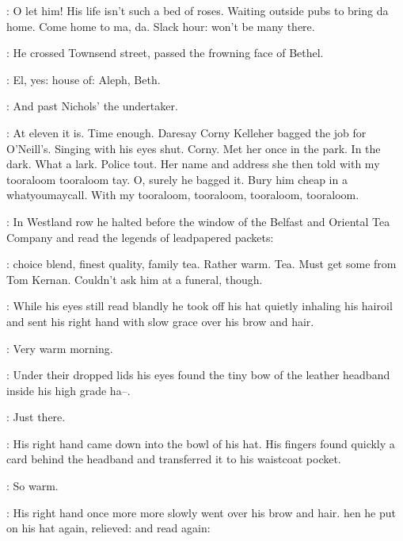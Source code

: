 \BloomInt:
O let him!
His life isn't such a bed of roses.
Waiting outside pubs to bring da home.
Come home to ma, da.
Slack hour: won't be many there.

:
He crossed Townsend street,
passed the frowning face of Bethel.

\BloomInt:
El, yes:
house of: Aleph, Beth.

:
And past Nichols' the undertaker.

\BloomInt:
At eleven it is.
Time enough.
Daresay Corny Kelleher bagged the job for O'Neill's.
Singing with his eyes shut.
Corny.
Met her once in the park.
In the dark.
What a lark.
Police tout.
Her name and address she then told
with my tooraloom tooraloom tay.
O, surely he bagged it.
Bury him cheap in a whatyoumaycall.
With my tooraloom, tooraloom, tooraloom, tooraloom.


:
In Westland row
he halted before the window of the Belfast and Oriental Tea Company
and read the legends of leadpapered packets:

\BloomInt:
choice blend, finest quality, family tea.
Rather warm.
Tea.
Must get some from Tom Kernan.
Couldn't ask him at a funeral, though.

:
While his eyes still read blandly
he took off his hat
quietly inhaling his hairoil
and sent his right hand with slow grace over his brow and hair.

\BloomInt:
Very warm morning.

:
Under their dropped lids
his eyes found the tiny bow of the leather headband inside his high grade ha--.

\BloomInt:
Just there.

:
His right hand came down into the bowl of his hat.
His fingers found quickly a card behind the headband
and transferred it to his waistcoat pocket.


\BloomInt:
So warm.

:
His right hand once more more slowly went over his brow and hair. 
hen he put on his hat again, relieved:
and read again:

